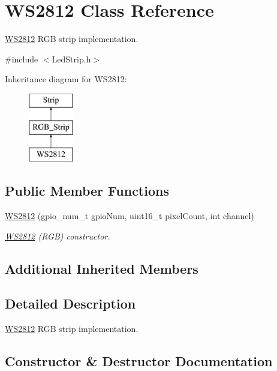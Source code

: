 \hypertarget{classWS2812}{}\section{W\+S2812 Class Reference}
\label{classWS2812}


\mbox{\hyperlink{classWS2812}{W\+S2812}} R\+GB strip implementation.  




{\ttfamily \#include $<$Led\+Strip.\+h$>$}

Inheritance diagram for W\+S2812\+:\begin{figure}[H]
\begin{center}
\leavevmode
\includegraphics[height=3.000000cm]{classWS2812}
\end{center}
\end{figure}
\subsection*{Public Member Functions}
\begin{DoxyCompactItemize}
\item 
\mbox{\hyperlink{classWS2812_abb835bca01769339c301ced49a15cf7a}{W\+S2812}} (gpio\+\_\+num\+\_\+t gpio\+Num, uint16\+\_\+t pixel\+Count, int channel)
\begin{DoxyCompactList}\small\item\em \mbox{\hyperlink{classWS2812}{W\+S2812}} (R\+GB) constructor. \end{DoxyCompactList}\end{DoxyCompactItemize}
\subsection*{Additional Inherited Members}


\subsection{Detailed Description}
\mbox{\hyperlink{classWS2812}{W\+S2812}} R\+GB strip implementation. 

\subsection{Constructor \& Destructor Documentation}
\mbox{\label{classWS2812_abb835bca01769339c301ced49a15cf7a}} 
